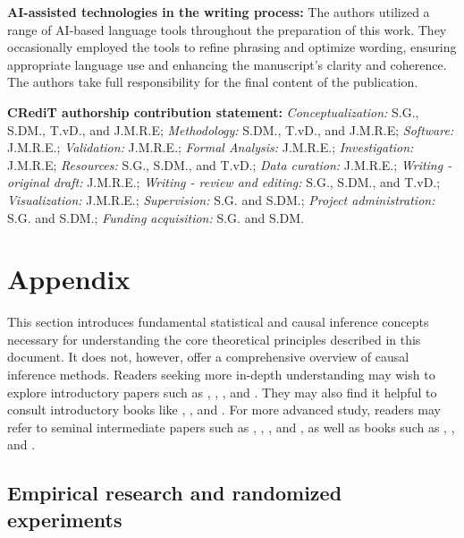 \documentclass[
  authoryear,
  review,
  1p]{elsarticle}
\begin{document}
\textbf{AI-assisted technologies in the writing process:} The authors
utilized a range of AI-based language tools throughout the preparation
of this work. They occasionally employed the tools to refine phrasing
and optimize wording, ensuring appropriate language use and enhancing
the manuscript's clarity and coherence. The authors take full
responsibility for the final content of the publication.

\textbf{CRediT authorship contribution statement:}
\emph{Conceptualization:} S.G., S.DM., T.vD., and J.M.R.E;
\emph{Methodology:} S.DM., T.vD., and J.M.R.E; \emph{Software:}
J.M.R.E.; \emph{Validation:} J.M.R.E.; \emph{Formal Analysis:} J.M.R.E.;
\emph{Investigation:} J.M.R.E; \emph{Resources:} S.G., S.DM., and T.vD.;
\emph{Data curation:} J.M.R.E.; \emph{Writing - original draft:}
J.M.R.E.; \emph{Writing - review and editing:} S.G., S.DM., and T.vD.;
\emph{Visualization:} J.M.R.E.; \emph{Supervision:} S.G. and S.DM.;
\emph{Project administration:} S.G. and S.DM.; \emph{Funding
acquisition:} S.G. and S.DM.

\newpage{}

\section{Appendix}\label{sec-appendix}

This section introduces fundamental statistical and causal inference
concepts necessary for understanding the core theoretical principles
described in this document. It does not, however, offer a comprehensive
overview of causal inference methods. Readers seeking more in-depth
understanding may wish to explore introductory papers such as
\citet{Pearl_2010}, \citet{Rohrer_2018}, \citet{Pearl_2019}, and
\citet{Cinelli_et_al_2020}. They may also find it helpful to consult
introductory books like \citet{Pearl_et_al_2018}, \citet{Neal_2020}, and
\citet{McElreath_2020}. For more advanced study, readers may refer to
seminal intermediate papers such as \citet{Neyman_et_al_1923},
\citet{Rubin_1974}, \citet{Spirtes_et_al_1991}, and \citet{Sekhon_2009},
as well as books such as \citet{Pearl_2009}, \citet{Morgan_et_al_2014},
and \citet{Hernan_et_al_2020}.

\subsection{Empirical research and randomized
experiments}\label{sec-appendix-A}
\end{document}
